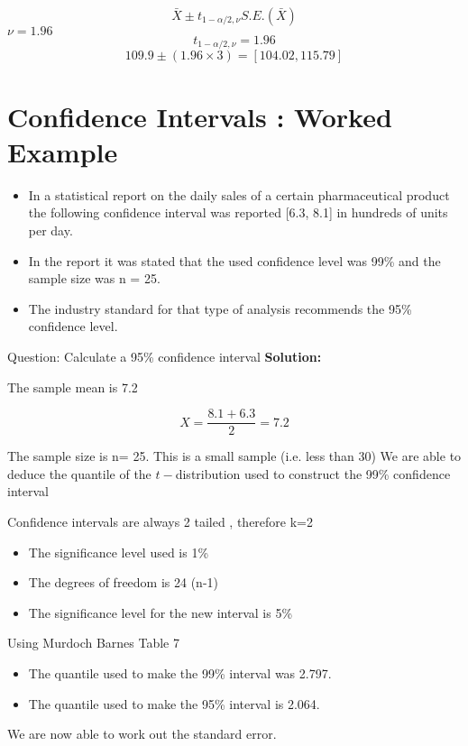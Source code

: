 \documentclass[]{report}
\begin{document}
\begin{equation}
\bar{X} \pm t_{1-\alpha/2,\nu}S.E.(\bar{X})
\end{equation}
$\nu = 1.96$
\begin{equation}
t_{1-\alpha/2,\nu} = 1.96
\end{equation}
\begin{equation}
109.9 \pm (1.96 \times 3) = [104.02, 115.79]
\end{equation}





\section*{Confidence Intervals : Worked Example}

\begin{itemize} 
\item In a statistical report on the daily sales of a certain pharmaceutical product the following confidence interval was reported [6.3, 8.1] in hundreds of units per day.

\item In the report it was stated that the used confidence level was 99\% and the sample size was n = 25. 
\item The industry standard for that type of analysis recommends the 95\% confidence level.
\end{itemize}
Question: Calculate a 95\% confidence interval
\textbf{Solution:}

The sample mean is 7.2

\[X=\frac{8.1 + 6.3}{2}=7.2\]

The sample size is n= 25. This is a small sample (i.e. less than 30)
We are able to deduce the quantile of the $t-$distribution used to construct the 99\% confidence interval

Confidence intervals are always 2 tailed , therefore k=2
\begin{itemize}
\item The significance level used is 1\%
\item The degrees of freedom  is 24 (n-1)
\item The significance level for the new interval is 5\%
\end{itemize}
Using Murdoch Barnes Table 7
\begin{itemize}
\item The quantile used to make the 99\% interval was 2.797.
\item The quantile used to make the 95\% interval is 2.064.
\end{itemize}
We are now able to work out the standard error.
\end{document}
